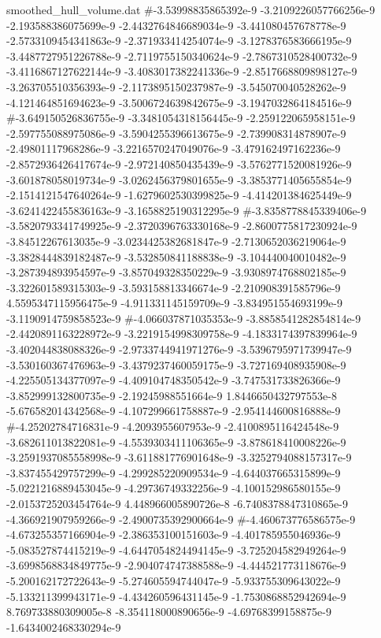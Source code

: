 \begin{filecontents}{smoothed_hull_volume.dat}
#-3.53998835865392e-9	-3.2109226057766256e-9	-2.193588386075699e-9	-2.4432764846689034e-9	-3.441080457678778e-9	-2.5733109454341863e-9	-2.371933414254074e-9	-3.1278376583666195e-9	-3.4487727951226788e-9	-2.7119755150340624e-9	-2.7867310528400732e-9	-3.4116867127622144e-9	-3.4083017382241336e-9	-2.8517668809898127e-9	-3.263705510356393e-9	-2.1173895150237987e-9	-3.545070040528262e-9	-4.121464851694623e-9	-3.5006724639842675e-9	-3.1947032864184516e-9
#-3.649150526836755e-9	-3.3481054318156445e-9	-2.259122065958151e-9	-2.597755088975086e-9	-3.5904255396613675e-9	-2.739908314878907e-9	-2.49801117968286e-9	-3.2216570247049076e-9	-3.479162497162236e-9	-2.8572936426417674e-9	-2.972140850435439e-9	-3.5762771520081926e-9	-3.601878058019734e-9	-3.0262456379801655e-9	-3.3853771405655854e-9	-2.1514121547640264e-9	-1.6279602530399825e-9	-4.414201384625449e-9	-3.6241422455836163e-9	-3.1658825190312295e-9
#-3.8358778845339406e-9	-3.5820793341749925e-9	-2.3720396763330168e-9	-2.8600775817230924e-9	-3.84512267613035e-9	-3.0234425382681847e-9	-2.7130652036219064e-9	-3.3828444839182487e-9	-3.532850841188838e-9	-3.104440040010482e-9	-3.287394893954597e-9	-3.857049328350229e-9	-3.9308974768802185e-9	-3.322601589315303e-9	-3.593158813346674e-9	-2.210908391585796e-9	4.5595347115956475e-9	-4.911331145159709e-9	-3.834951554693199e-9	-3.1190914759858523e-9
#-4.066037871035353e-9	-3.8858541282854814e-9	-2.4420891163228972e-9	-3.2219154998309758e-9	-4.1833174397839964e-9	-3.402044838088326e-9	-2.9733744941971276e-9	-3.5396795971739947e-9	-3.530160367476963e-9	-3.4379237460059175e-9	-3.727169408935908e-9	-4.225505134377097e-9	-4.409104748350542e-9	-3.747531733826366e-9	-3.852999132800735e-9	-2.19245988551664e-9	1.8446650432797553e-8	-5.676582014342568e-9	-4.107299661758887e-9	-2.954144600816888e-9
#-4.25202784716831e-9	-4.2093955607953e-9	-2.4100895116424548e-9	-3.682611013822081e-9	-4.5539303411106365e-9	-3.878618410008226e-9	-3.2591937085558998e-9	-3.611881776901648e-9	-3.3252794088157317e-9	-3.837455429757299e-9	-4.299285220909534e-9	-4.644037665315899e-9	-5.0221216889453045e-9	-4.29736749332256e-9	-4.100152986580155e-9	-2.0153725203454764e-9	4.448966005890726e-8	-6.7408378847310865e-9	-4.366921907959266e-9	-2.4900735392900664e-9
#-4.460673776586575e-9	-4.673255357166904e-9	-2.386353100151603e-9	-4.401785955046936e-9	-5.083527874415219e-9	-4.6447054824494145e-9	-3.725204582949264e-9	-3.6998568834849775e-9	-2.904074747388588e-9	-4.444521773118676e-9	-5.200162172722643e-9	-5.274605594744047e-9	-5.933755309643022e-9	-5.133211399943171e-9	-4.434260596431145e-9	-1.7530868852942694e-9	8.769733880309005e-8	-8.354118000890656e-9	-4.69768399158875e-9	-1.6434002468330294e-9

\end{filecontents}
